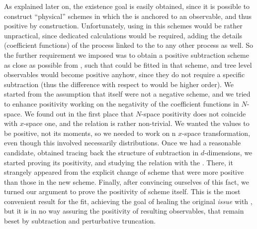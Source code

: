 As explained later on, the existence goal is easily obtained, since it is
possible to construct \enquote{physical} schemes in which the \pdf is anchored
to an observable, and thus positive by construction.
%
Unfortunately, using \pdfs in this schemes would be rather unpractical, since
dedicated calculations would be required, adding the details (coefficient
functions) of the process linked to the \pdfs to any other process as well.
So the further requirement we imposed was to obtain a positive subtraction
scheme as close as possible from \msbar, such that \pdfs could be fitted in
that scheme, and tree level observables would become positive anyhow, since
they do not require a specific subtraction (thus the difference with respect to
\msbar would be higher order).
%
We started from the assumption that \msbar itself were not a negative scheme,
and we tried to enhance positivity working on the negativity of the coefficient
functions in $N$-space.
%
We found out in the first place that $N$-space positivity does not coincide
with $x$-space one, and the relation is rather non-trivial.
We wanted the \pdf values to be positive, not its moments, so we needed to work
on n $x$-space transformation, even though this involved necessarily
distributions.
%
Once we had a reasonable candidate, obtained tracing back the structure of
\msbar subtraction in $d$-dimensions, we started proving its positivity, and
studying the relation with the \msbar.
There, it strangely appeared from the explicit change of scheme that \msbar
\pdfs were more positive than those in the new scheme.
%
Finally, after convincing ourselves of this fact, we turned our argument to
prove the positivity of \msbar scheme itself.
This is the most convenient result for the \pdf fit, achieving the goal of
healing the original \textit{issue} with , but it is in no way
assuring the positivity of resulting observables, that remain beset by
subtraction and perturbative truncation.

